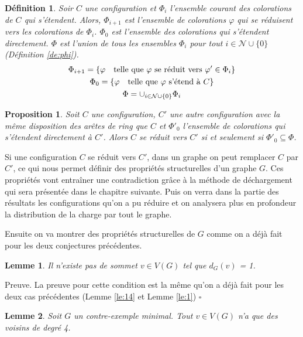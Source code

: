 \documentclass[10pt,a4paper]{article}
\newtheorem{definition}{Définition}
\newtheorem{proposition}{Proposition}
\newtheorem{lemme}{Lemme}
\newcommand{\ep}{{\hfill $\square$}}
\begin{document}
\begin{definition}
Soir $C$ une configuration et $\Phi_i$ l'ensemble courant des colorations de $C$ qui s'étendent. Alors, $\Phi_{i+1}$ est l'ensemble de colorations $\varphi$ qui se réduisent vers les colorations de $\Phi_i$. $\Phi_0$ est l'ensemble des colorations qui s'étendent directement. $\Phi$ est l'union de tous les ensembles $\Phi_i$ pour tout $i \in \mathcal{N} \cup \lbrace 0\rbrace$ (Définition \ref{de:phi}). 
$$
\gathered
\Phi_{i+1} = \lbrace \varphi \quad \textrm{telle que $\varphi$ se réduit vers $\varphi' \in \Phi_i$} \rbrace\\
\Phi_0 = \lbrace \varphi \quad \textrm{telle que $\varphi$ s'étend à $C$} \rbrace\\
\Phi = \cup_{i \in \mathcal{N}\cup \lbrace 0 \rbrace} \Phi_i 
\endgathered
$$
\end{definition}

\begin{proposition}
Soit $C$ une configuration, $C'$ une autre configuration avec la même disposition des arêtes de ring que $C$ et $\Phi'_0$ l'ensemble de colorations qui s'étendent directement à $C'$. Alors $C$ se réduit vers $C'$ si et seulement si $\Phi'_0 \subseteq \Phi$.
\end{proposition}
\bigskip

Si une configuration $C$ se réduit vers $C'$, dans un graphe on peut remplacer $C$ par $C'$, ce qui nous permet définir des propriétés structurelles d'un graphe $G$. Ces propriétés vont entraîner une contradiction grâce à la méthode de déchargement qui sera présentée dans le chapitre suivante. Puis on verra dans la partie des résultats les configurations qu'on a pu réduire et on analysera plus en profondeur la distribution de la charge par tout le graphe.

Ensuite on va montrer des propriétés structurelles de $G$ comme on a déjà fait pour les deux conjectures précédentes.

\begin{lemme}
Il n'existe pas de sommet $v \in V(G)$ tel que $d_G(v)$ = 1.
\end{lemme}

Preuve. 
La preuve pour cette condition est la même qu'on a déjà fait pour les deux cas précédentes (Lemme \ref{le:14} et Lemme \ref{le:1})
\ep

\begin{lemme}
Soit $G$ un contre-exemple minimal. Tout $v\in V(G)$ n'a que des voisins de degré 4.
\end{lemme}
\end{document}
